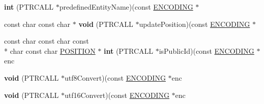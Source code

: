 \begin{DoxyCompactItemize}
\item 
\hypertarget{structencoding_ad6e499c3d355096e9de13217dd90747b}{{\bfseries int} (P\-T\-R\-C\-A\-L\-L $\ast$predefined\-Entity\-Name)(const \hyperlink{structencoding}{E\-N\-C\-O\-D\-I\-N\-G} $\ast$}\label{structencoding_ad6e499c3d355096e9de13217dd90747b}

\item 
\hypertarget{structencoding_ace1e68c54960a8b21f2d8d1ff04ba4f5}{const char const char $\ast$ {\bfseries void} (P\-T\-R\-C\-A\-L\-L $\ast$update\-Position)(const \hyperlink{structencoding}{E\-N\-C\-O\-D\-I\-N\-G} $\ast$}\label{structencoding_ace1e68c54960a8b21f2d8d1ff04ba4f5}

\item 
\hypertarget{structencoding_ae900a736a1f991333fd4223adb1abc53}{const char const char const \\*
char const char \hyperlink{structposition}{P\-O\-S\-I\-T\-I\-O\-N} $\ast$ {\bfseries int} (P\-T\-R\-C\-A\-L\-L $\ast$is\-Public\-Id)(const \hyperlink{structencoding}{E\-N\-C\-O\-D\-I\-N\-G} $\ast$enc}\label{structencoding_ae900a736a1f991333fd4223adb1abc53}

\item 
\hypertarget{structencoding_a3fdd1f3fb0b6ab3abd7fd9ba5f13ae2a}{{\bfseries void} (P\-T\-R\-C\-A\-L\-L $\ast$utf8\-Convert)(const \hyperlink{structencoding}{E\-N\-C\-O\-D\-I\-N\-G} $\ast$enc}\label{structencoding_a3fdd1f3fb0b6ab3abd7fd9ba5f13ae2a}

\item 
\hypertarget{structencoding_a24ca2fe42f1f54cbe40aeaca5770e6f1}{{\bfseries void} (P\-T\-R\-C\-A\-L\-L $\ast$utf16\-Convert)(const \hyperlink{structencoding}{E\-N\-C\-O\-D\-I\-N\-G} $\ast$enc}\label{structencoding_a24ca2fe42f1f54cbe40aeaca5770e6f1}

\end{DoxyCompactItemize}
